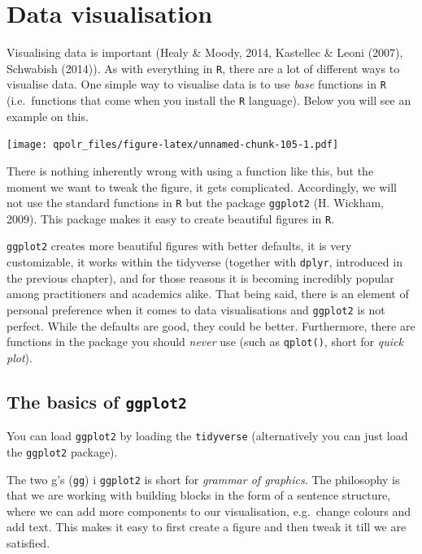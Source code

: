\documentclass[12pt,oneside]{reedthesis}
\theoremstyle{definition}
\theoremstyle{definition}
\theoremstyle{definition}
\theoremstyle{remark}
\begin{document}
  \chapter{Data visualisation}\label{dataviz}
  
  Visualising data is important (Healy \& Moody, 2014, Kastellec \& Leoni
  (2007), Schwabish (2014)). As with everything in \texttt{R}, there are a
  lot of different ways to visualise data. One simple way to visualise
  data is to use \emph{base} functions in \texttt{R} (i.e.~functions that
  come when you install the \texttt{R} language). Below you will see an
  example on this.
  \begin{Shaded}
  \begin{Highlighting}[]
  \NormalTok{(}\OperatorTok{$}\OperatorTok{$}
  \end{Highlighting}
  \end{Shaded}
  \texttt{[image: qpolr\_files/figure-latex/unnamed-chunk-105-1.pdf]}
  
  There is nothing inherently wrong with using a function like this, but
  the moment we want to tweak the figure, it gets complicated.
  Accordingly, we will not use the standard functions in \texttt{R} but
  the package \texttt{ggplot2} (H. Wickham, 2009). This package makes it
  easy to create beautiful figures in \texttt{R}.
  
  \texttt{ggplot2} creates more beautiful figures with better defaults, it
  is very customizable, it works within the tidyverse (together with
  \texttt{dplyr}, introduced in the previous chapter), and for those
  reasons it is becoming incredibly popular among practitioners and
  academics alike. That being said, there is an element of personal
  preference when it comes to data visualisations and \texttt{ggplot2} is
  not perfect. While the defaults are good, they could be better.
  Furthermore, there are functions in the package you should \emph{never}
  use (such as \texttt{qplot()}, short for \emph{quick plot}).
  
  \section{\texorpdfstring{The basics of
  \texttt{ggplot2}}{The basics of ggplot2}}\label{the-basics-of-ggplot2}
  
  You can load \texttt{ggplot2} by loading the \texttt{tidyverse}
  (alternatively you can just load the \texttt{ggplot2} package).
  \begin{Shaded}
  \begin{Highlighting}[]
  \NormalTok{(}\NormalTok{)}
  \end{Highlighting}
  \end{Shaded}
  The two g's (\texttt{gg}) i \texttt{ggplot2} is short for \emph{grammar
  of graphics}. The philosophy is that we are working with building blocks
  in the form of a sentence structure, where we can add more components to
  our visualisation, e.g.~change colours and add text. This makes it easy
  to first create a figure and then tweak it till we are satisfied.
  
\end{document}
